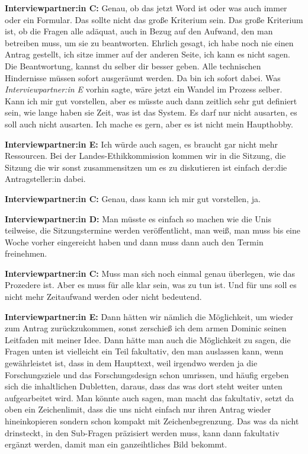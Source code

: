 \documentclass[a4paper,12pt,twoside]{scrreprt}
\begin{document}
\textbf{Interviewpartner:in C:} Genau, ob das jetzt Word ist oder was auch immer oder ein Formular. Das sollte nicht das große Kriterium sein. Das große Kriterium ist, ob die Fragen alle adäquat, auch in Bezug auf den Aufwand, den man betreiben muss, um sie zu beantworten. Ehrlich gesagt, ich habe noch nie einen Antrag gestellt, ich sitze immer auf der anderen Seite, ich kann es nicht sagen. Die Beantwortung, kannst du selber dir besser geben. Alle technischen Hindernisse müssen sofort ausgeräumt werden. Da bin ich sofort dabei. Was \textit{Interviewpartner:in E} vorhin sagte, wäre jetzt ein Wandel im Prozess selber. Kann ich mir gut vorstellen, aber es müsste auch dann zeitlich sehr gut definiert sein, wie lange haben sie Zeit, was ist das System. Es darf nur nicht ausarten, es soll auch nicht ausarten. Ich mache es gern, aber es ist nicht mein Haupthobby.

\textbf{Interviewpartner:in E:} Ich würde auch sagen, es braucht gar nicht mehr Ressourcen. Bei der Landes-Ethikkommission kommen wir in die Sitzung, die Sitzung die wir sonst zusammensitzen um es zu diskutieren ist einfach der:die Antragsteller:in dabei.

\textbf{Interviewpartner:in C:} Genau, dass kann ich mir gut vorstellen, ja.

\textbf{Interviewpartner:in D:} Man müsste es einfach so machen wie die Unis teilweise, die Sitzungstermine werden veröffentlicht, man weiß, man muss bis eine Woche vorher eingereicht haben und dann muss dann auch den Termin freinehmen.

\textbf{Interviewpartner:in C:} Muss man sich noch einmal genau überlegen, wie das Prozedere ist. Aber es muss für alle klar sein, was zu tun ist. Und für uns soll es nicht mehr Zeitaufwand werden oder nicht bedeutend.

\textbf{Interviewpartner:in E:} Dann hätten wir nämlich die Möglichkeit, um wieder zum Antrag zurückzukommen, sonst zerschieß ich dem armen Dominic seinen Leitfaden mit meiner Idee. Dann hätte man auch die Möglichkeit zu sagen, die Fragen unten ist vielleicht ein Teil fakultativ, den man auslassen kann, wenn gewährleistet ist, dass in dem Haupttext, weil irgendwo werden ja die Forschungsziele und das Forschungsdesign schon umrissen, und häufig ergeben sich die inhaltlichen Dubletten, daraus, dass das was dort steht weiter unten aufgearbeitet wird. Man könnte auch sagen, man macht das fakultativ, setzt da oben ein Zeichenlimit, dass die uns nicht einfach nur ihren Antrag wieder hineinkopieren sondern schon kompakt mit Zeichenbegrenzung. Das was da nicht drinsteckt, in den Sub-Fragen präzisiert werden muss, kann dann fakultativ ergänzt werden, damit man ein ganzeihtliches Bild bekommt.
\end{document}
